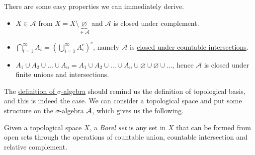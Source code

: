 \begin{remark}
	There are some easy properties we can immediately derive.
	\begin{itemize}
		\item \(X\in \mathcal{A} \) from \(X = X\setminus \underbrace{\varnothing}_{\in \mathcal{A}} \) and \(\mathcal{A}\) is closed under complement.
		\item \(\bigcap\limits_{i=1}^{\infty} A_{i} = \left(\bigcup\limits_{i=1}^{\infty} A_{i}^{c} \right)^c\), namely \(\mathcal{A} \) is \underline{closed under countable intersections}.
		\item \(A_1\cup A_2 \cup \ldots \cup A_n = A_1\cup A_2 \cup \ldots \cup A_n \cup \varnothing \cup \varnothing \cup\ldots\), hence \(\mathcal{A} \) is closed under finite unions and intersections.
	\end{itemize}
\end{remark}

\begin{note}
	The \hyperref[def:sigma-algebra]{definition of \(\sigma\)-algebra} should remind us the definition of topological basis, and this is indeed the case.
	We can consider a topological space and put some structure on the \hyperref[def:sigma-algebra]{\(\sigma\)-algebra} \(\mathcal{\MakeUppercase{a}} \),
	which gives us the following.
\end{note}

\begin{definition}\label{def:Borel-set}
	Given a topological space \(X\), a \emph{Borel set} is any set in \(X\) that can be formed from open sets through the operations of countable union, countable intersection and relative complement.
\end{definition}
